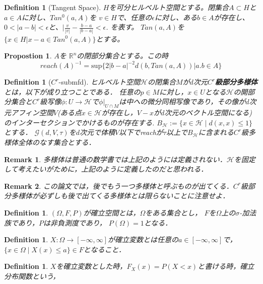 \documentclass{ujarticle}
\newtheorem{dfn}[thm]{Definition}
\newtheorem{prop}[thm]{Propostion}
\newtheorem*{rem}{Remark}
\newcommand{\gdvt}{\mathcal{G}(d,V,\tau)}
\begin{document}
\begin{dfn}[Tangent Space]
$H$を可分ヒルベルト空間とする。閉集合$A \subset H$と$a \in A$に対し、$Tan^0(a,A)$を
$v \in H$で、任意の$\epsilon$に対し、ある$b \in A$が存在し、$0 <|a -b| < \epsilon$と、$|\frac{v}{|v|} - \frac{b-a}{|b-a|} < \epsilon$.
を表す。
$Tan(a,A)$を$\{x \in H| x -a \in Tan^0(a,A)\}$とする。
\end{dfn}

\begin{prop} $A$を $\mathbb{R}^n$の閉部分集合とする。この時
  \begin{equation*}
   reach(A)^{-1}=\mathrm{sup}\{2|b-a|^{-2}d(b,Tan(a,A)) | a.b \in A\}
  \end{equation*}
\end{prop}
\begin{dfn}[$C^r$-submfd]
ヒルベルト空間$\mathcal{H}$の閉集合$M$が$d$次元$C^r$\textbf{級部分多様体}とは，以下が成り立つことである．
任意の$p \in M$に対し，$x \in U$となる$\mathcal{H}$の開部分集合と$C^r$級写像$\phi:U \to \mathcal{H}$で$\phi|_{U \cap M}$は中への微分同相写像であり，その像が$d$次元アフィン空間$V$(ある点$x\in \mathcal{H}$が存在し，$V-x$が$d$次元のベクトル空間になる)のインターセクションでかけるものが存在する.
  $B_{\mathcal{H}}:= \{ x \in \mathcal{H} \mid d(x,x) \le 1 \}$とする．
$\gdvt$を$d$次元で体積$V$以下でreachが$\tau$以上で$B_{\mathcal{H}}$に含まれる$C^r$級多様体全体のなす集合とする．

\end{dfn}
\begin{rem}
 多様体は普通の数学書では上記のようには定義されない．$\mathcal{H}$を固定して考えたいがために，上記のように定義したのだと思われる．
\end{rem}
\begin{rem}
 この論文では，後でもう一つ多様体と呼ぶものが出てくる．$C^r$級部分多様体が必ずしも後で出てくる多様体とは限らないことに注意せよ．
\end{rem}

\begin{dfn}
 $(\Omega,F,P)$が確立空間とは，$\Omega$をある集合とし，
 $F$を$\Omega$上の$\sigma$-加法族であり，$P$は非負測度であり，
 $P(\Omega)=1$となる．
\end{dfn}
\begin{dfn}
 $X:\Omega \to [-\infty,\infty]$が確立変数とは任意の$a \in [-\infty,\infty]$で，$\{x \in \Omega \mid X(x) \le a \} \in F$となること．
\end{dfn}
\begin{dfn}
 $X$を確立変数とした時，$F_X(x) = P(X <x)$と書ける時，確立分布関数という，
\end{dfn}
\end{document}
